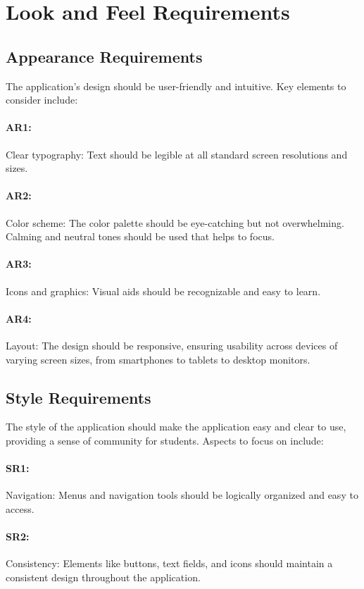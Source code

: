 \documentclass[12pt]{article}
\begin{document}
\section{Look and Feel Requirements}

\subsection{Appearance Requirements}
The application's design should be user-friendly and intuitive. Key elements to consider include:
\paragraph{AR1:} Clear typography: Text should be legible at all standard screen resolutions and sizes. 
\paragraph{AR2:}Color scheme: The color palette should be eye-catching but not overwhelming. Calming and neutral tones should be used that helps to focus.
\paragraph{AR3:}Icons and graphics: Visual aids should be recognizable and easy to learn.
\paragraph{AR4:}Layout: The design should be responsive, ensuring usability across devices of varying screen sizes, from smartphones to tablets to desktop monitors.

\subsection{Style Requirements}
The style of the application should make the application easy and clear to use, providing a sense of community for students. Aspects to focus on include:
\paragraph{SR1:}Navigation: Menus and navigation tools should be logically organized and easy to access. 
\paragraph{SR2:}Consistency: Elements like buttons, text fields, and icons should maintain a consistent design throughout the application.
\end{document}
